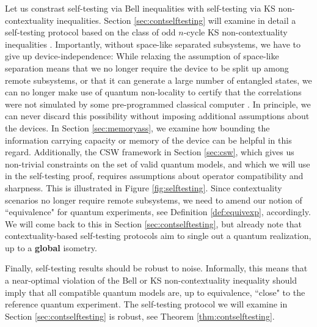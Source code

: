 Let us constrast self-testing via Bell inequalities with self-testing via KS non-contextuality inequalities. Section \ref{sec:contselftesting} will examine in detail a self-testing protocol based on the class of odd $n$-cycle KS non-contextuality inequalities \cite{Bharti2019}. Importantly, without space-like separated subsystems, we have to give up device-independence: While relaxing the assumption of space-like separation means that we no longer require the device to be split up among remote subsystems, or that it can generate a large number of entangled states, we can no longer make use of quantum non-locality to certify that the correlations were not simulated by some pre-programmed classical computer \cite{Supic2020}. In principle, we can never discard this possibility without imposing additional assumptions about the devices. In Section \ref{sec:memoryass}, we examine how bounding the information carrying capacity or memory of the device can be helpful in this regard. Additionally, the CSW framework in Section \ref{sec:csw}, which gives us non-trivial constraints on the set of valid quantum models, and which we will use in the self-testing proof, requires assumptions about operator compatibility and sharpness. This is illustrated in Figure \ref{fig:selftesting}. Since contextuality scenarios no longer require remote subsystems, we need to amend our notion of ``equivalence" for quantum experiments, see Definition \ref{def:equivexp}, accordingly. We will come back to this in Section \ref{sec:contselftesting}, but already note that contextuality-based self-testing protocols aim to single out a quantum realization, up to a \textbf{global} isometry.

Finally, self-testing results should be robust to noise. Informally, this means that a near-optimal violation of the Bell or KS non-contextuality inequality should imply that all compatible quantum models are, up to equivalence, ``close" to the reference quantum experiment. The self-testing protocol we will examine in Section \ref{sec:contselftesting} is robust, see Theorem \ref{thm:contselftesting}.

